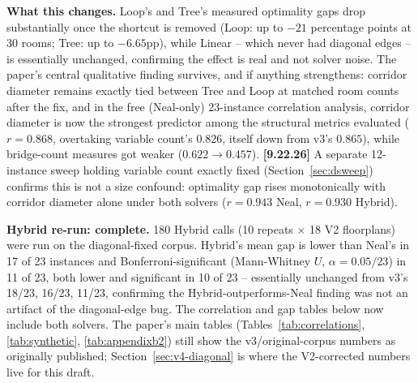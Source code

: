 \documentclass[11pt]{article}
\begin{document}
\textbf{What this changes.} Loop's and Tree's measured optimality gaps drop substantially once the shortcut is removed (Loop: up to $-21$ percentage points at 30 rooms; Tree: up to $-6.65$pp), while Linear -- which never had diagonal edges -- is essentially unchanged, confirming the effect is real and not solver noise. The paper's central qualitative finding survives, and if anything strengthens: corridor diameter remains exactly tied between Tree and Loop at matched room counts after the fix, and in the free (Neal-only) 23-instance correlation analysis, corridor diameter is now the strongest predictor among the structural metrics evaluated ($r=0.868$, overtaking variable count's $0.826$, itself down from v3's $0.865$), while bridge-count measures got weaker ($0.622 \to 0.457$). \textbf{[9.22.26]} A separate 12-instance sweep holding variable count exactly fixed (Section~\ref{sec:dsweep}) confirms this is not a size confound: optimality gap rises monotonically with corridor diameter alone under both solvers ($r=0.943$ Neal, $r=0.930$ Hybrid).

\textbf{Hybrid re-run: complete.} 180 Hybrid calls (10 repeats $\times$ 18 V2 floorplans) were run on the diagonal-fixed corpus. Hybrid's mean gap is lower than Neal's in 17 of 23 instances and Bonferroni-significant (Mann-Whitney $U$, $\alpha=0.05/23$) in 11 of 23, both lower and significant in 10 of 23 -- essentially unchanged from v3's 18/23, 16/23, 11/23, confirming the Hybrid-outperforms-Neal finding was not an artifact of the diagonal-edge bug. The correlation and gap tables below now include both solvers. The paper's main tables (Tables~\ref{tab:correlations}, \ref{tab:synthetic}, \ref{tab:appendixb2}) still show the v3/original-corpus numbers as originally published; Section~\ref{sec:v4-diagonal} is where the V2-corrected numbers live for this draft.
\end{document}
